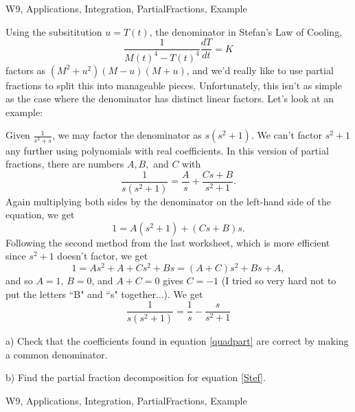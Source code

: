 \begin{tagblock}{W9, Applications, Integration, PartialFractions, Example}
\begin{question}
	


Using the subsititution $u=T(t)$, the denominator in Stefan's Law of Cooling,
\begin{equation}\label{Stef}
\frac 1 {M(t)^4-T(t)^4}\frac{dT}{dt}=K
\end{equation}
factors as $(M^2+u^2)(M-u)(M+u)$, and we'd really like to use partial fractions to split this into manageable pieces. Unfortunately, this isn't as simple as the case where the denominator has distinct linear factors. Let's look at an example:

Given $\displaystyle\frac 1 {s^3+s}$, we may factor the denominator as $s(s^2+1)$. We can't factor $s^2+1$ any further using polynomials with real coefficients. In this version of partial fractions, there are numbers $A,B,$ and $C$ with
\[
\frac 1 {s(s^2+1)}=\frac A s + \frac {Cs+B}{s^2+1}.
\]
Again multiplying both sides by the denominator on the left-hand side of the equation, we get
\[
1=A(s^2+1)+(Cs+B)s.
\]
Following the second method from the last worksheet, which is more efficient since $s^2+1$ doesn't factor, we get
\[
1=As^2+A+Cs^2+Bs=(A+C)s^2+Bs+A,
\] 
and so $A=1$, $B=0$, and $A+C=0$ gives $C=-1$ (I tried so very hard not to put the letters ``B" and ``s" together...). We get
\begin{equation}\label{quadpart}
\frac 1 {s(s^2+1)}=\frac 1 s-\frac s {s^2+1}
\end{equation}

\bigskip

a) Check that the coefficients found in equation \eqref{quadpart} are correct by making a common denominator. 

\bigskip

b) Find the partial fraction decomposition for equation \eqref{Stef}.

    
\begin{tags}
       W9, Applications, Integration, PartialFractions, Example
\end{tags}
    
\begin{diary}
\end{diary}
	
\begin{solution}

\end{solution}
	
\end{question}

\end{tagblock}

